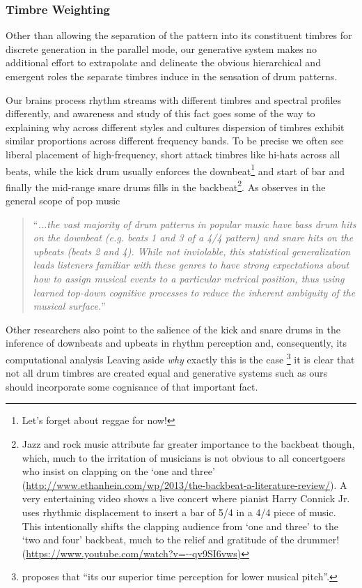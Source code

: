 {{{\subsubsection{Timbre Weighting}

Other than allowing the separation of the pattern into its constituent timbres for discrete generation in the parallel mode, our generative system makes no additional effort to extrapolate and delineate the obvious hierarchical and emergent roles the separate timbres induce in the sensation of drum patterns. 

Our brains process rhythm streams with different timbres and spectral profiles differently, and awareness and study of this fact goes some of the way to explaining why across different styles and cultures dispersion of timbres exhibit similar proportions across different frequency bands. To be precise we often see liberal placement of high-frequency, short attack timbres like hi-hats across all beats, while the kick drum usually enforces the downbeat\footnote{Let's forget about reggae for now!} and start of bar and finally the mid-range snare drums fills in the backbeat\footnote{Jazz and rock music attribute far greater importance to the backbeat though, which, much to the irritation of musicians is not obvious to all concertgoers who insist on clapping on the `one and three' (\url{http://www.ethanhein.com/wp/2013/the-backbeat-a-literature-review/}). A very entertaining video shows a live concert where pianist Harry Connick Jr. uses rhythmic displacement to insert a bar of 5/4 in a 4/4 piece of music. This intentionally shifts the clapping audience from `one and three' to the `two and four' backbeat, much to the relief and gratitude of the drummer! (\url{https://www.youtube.com/watch?v=--qv9SI6vws)}}. As \cite{Merchant2015} observes in the general scope of pop music 

\blockcquote[]{Merchant2015}{``\textit{...the vast majority of drum patterns in popular music have bass drum hits on the downbeat (e.g. beats 1 and 3 of a 4/4 pattern) and snare hits on the upbeats (beats 2 and 4). While not inviolable, this statistical generalization leads listeners familiar with these genres to have strong expectations about how to assign musical events to a particular metrical position, thus using learned top-down cognitive processes to reduce the inherent ambiguity of the musical surface.}''}

Other researchers also point to the salience of the kick and snare drums in the inference of downbeats and upbeats in rhythm perception and, consequently, its computational analysis \citep{Zils2002, Panteli2014a, Gomez-Marin2017}  Leaving aside \textit{why} exactly this is the case \footnote{\cite{Hove2014} proposes that ``its our superior time perception for lower musical pitch''.} it is clear that not all drum timbres are created equal and generative systems such as ours should incorporate some cognisance of that important fact.

}}}
